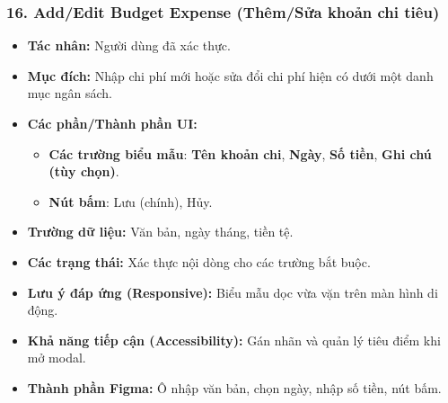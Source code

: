 \documentclass[11pt,a4paper]{article}
\begin{document}
\subsubsection{16. Add/Edit Budget Expense (Thêm/Sửa khoản chi tiêu)}
\begin{itemize}
    \item \textbf{Tác nhân:} Người dùng đã xác thực.
    \item \textbf{Mục đích:} Nhập chi phí mới hoặc sửa đổi chi phí hiện có dưới một danh mục ngân sách.
    \item \textbf{Các phần/Thành phần UI:}
    \begin{itemize}
        \item \textbf{Các trường biểu mẫu}: \textbf{Tên khoản chi}, \textbf{Ngày}, \textbf{Số tiền}, \textbf{Ghi chú (tùy chọn)}.
        \item \textbf{Nút bấm}: Lưu (chính), Hủy.
    \end{itemize}
    \item \textbf{Trường dữ liệu:} Văn bản, ngày tháng, tiền tệ.
    \item \textbf{Các trạng thái:} Xác thực nội dòng cho các trường bắt buộc.
    \item \textbf{Lưu ý đáp ứng (Responsive):} Biểu mẫu dọc vừa vặn trên màn hình di động.
    \item \textbf{Khả năng tiếp cận (Accessibility):} Gán nhãn và quản lý tiêu điểm khi mở modal.
    \item \textbf{Thành phần Figma:} Ô nhập văn bản, chọn ngày, nhập số tiền, nút bấm.
\end{itemize}
\end{document}
